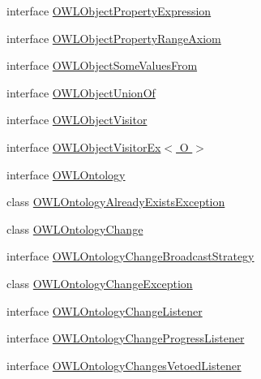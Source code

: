\begin{DoxyCompactItemize}
interface \hyperlink{interfaceorg_1_1semanticweb_1_1owlapi_1_1model_1_1_o_w_l_object_property_expression}{O\-W\-L\-Object\-Property\-Expression}
\item 
interface \hyperlink{interfaceorg_1_1semanticweb_1_1owlapi_1_1model_1_1_o_w_l_object_property_range_axiom}{O\-W\-L\-Object\-Property\-Range\-Axiom}
\item 
interface \hyperlink{interfaceorg_1_1semanticweb_1_1owlapi_1_1model_1_1_o_w_l_object_some_values_from}{O\-W\-L\-Object\-Some\-Values\-From}
\item 
interface \hyperlink{interfaceorg_1_1semanticweb_1_1owlapi_1_1model_1_1_o_w_l_object_union_of}{O\-W\-L\-Object\-Union\-Of}
\item 
interface \hyperlink{interfaceorg_1_1semanticweb_1_1owlapi_1_1model_1_1_o_w_l_object_visitor}{O\-W\-L\-Object\-Visitor}
\item 
interface \hyperlink{interfaceorg_1_1semanticweb_1_1owlapi_1_1model_1_1_o_w_l_object_visitor_ex_3_01_o_01_4}{O\-W\-L\-Object\-Visitor\-Ex$<$ O $>$}
\item 
interface \hyperlink{interfaceorg_1_1semanticweb_1_1owlapi_1_1model_1_1_o_w_l_ontology}{O\-W\-L\-Ontology}
\item 
class \hyperlink{classorg_1_1semanticweb_1_1owlapi_1_1model_1_1_o_w_l_ontology_already_exists_exception}{O\-W\-L\-Ontology\-Already\-Exists\-Exception}
\item 
class \hyperlink{classorg_1_1semanticweb_1_1owlapi_1_1model_1_1_o_w_l_ontology_change}{O\-W\-L\-Ontology\-Change}
\item 
interface \hyperlink{interfaceorg_1_1semanticweb_1_1owlapi_1_1model_1_1_o_w_l_ontology_change_broadcast_strategy}{O\-W\-L\-Ontology\-Change\-Broadcast\-Strategy}
\item 
class \hyperlink{classorg_1_1semanticweb_1_1owlapi_1_1model_1_1_o_w_l_ontology_change_exception}{O\-W\-L\-Ontology\-Change\-Exception}
\item 
interface \hyperlink{interfaceorg_1_1semanticweb_1_1owlapi_1_1model_1_1_o_w_l_ontology_change_listener}{O\-W\-L\-Ontology\-Change\-Listener}
\item 
interface \hyperlink{interfaceorg_1_1semanticweb_1_1owlapi_1_1model_1_1_o_w_l_ontology_change_progress_listener}{O\-W\-L\-Ontology\-Change\-Progress\-Listener}
\item 
interface \hyperlink{interfaceorg_1_1semanticweb_1_1owlapi_1_1model_1_1_o_w_l_ontology_changes_vetoed_listener}{O\-W\-L\-Ontology\-Changes\-Vetoed\-Listener}
\item 

\end{DoxyCompactItemize}
